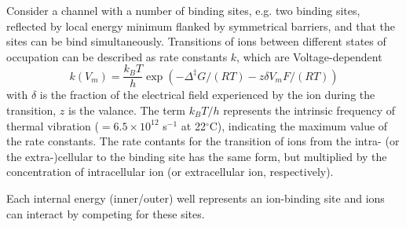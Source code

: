 Consider a channel with a number of binding sites, e.g. two binding sites,
reflected by local energy minimum flanked by symmetrical barriers, and that the
sites can be bind simultaneously. Transitions of ions between different states
of occupation can be described as rate constants $k$, which are
Voltage-dependent
\begin{equation}
k(V_m) = \frac{k_B T}{h}\exp\left( -\Delta ^\ddagger G/(RT) - z\delta V_m F/(RT)
\right)
\end{equation}
with $\delta$ is the fraction of the electrical field experienced by the ion
during the transition, $z$ is the valance. The term $k_BT/h$ represents the
intrinsic frequency of thermal vibration ($=6.5\times 10^{12}$ s$^{-1}$ at
22$^\circ$C), indicating the maximum value of the rate constants. The rate
contants for the transition of ions from the intra- (or the extra-)cellular to
the binding site has the same form, but multiplied by the
concentration of intracellular ion (or extracellular ion, respectively).
%

\begin{mdframed}
  Each internal energy (inner/outer) well represents an ion-binding site
  and ions can interact by competing for these sites.
\end{mdframed}

